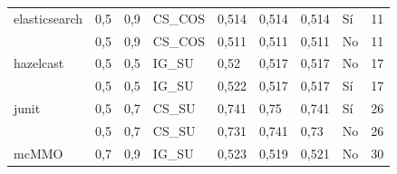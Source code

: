 \begin{table}[H]
{{\begin{tabular}{lllllllll}
elasticsearch                        & 0,5                               & 0,9                            & CS\_COS                                     & 0,514                                  & 0,514                               & 0,514                                 & Sí                               & 11                                        \\
                       & 0,5                               & 0,9                            & CS\_COS                                     & 0,511                                  & 0,511                               & 0,511                                 & No                                   & 11                                        \\
hazelcast                            & 0,5                               & 0,5                            & IG\_SU                                      & 0,52                                   & 0,517                               & 0,517                                 & No                                   & 17                                        \\
                            & 0,5                               & 0,5                            & IG\_SU                                      & 0,522                                  & 0,517                               & 0,517                                 & Sí                               & 17                                        \\
junit                                & 0,5                               & 0,7                            & CS\_SU                                      & 0,741                                  & 0,75                                & 0,741                                 & Sí                               & 26                                        \\
                                & 0,5                               & 0,7                            & CS\_SU                                      & 0,731                                  & 0,741                               & 0,73                                  & No                                   & 26                                        \\
mcMMO                                & 0,7                               & 0,9                            & IG\_SU                                      & 0,523                                  & 0,519                               & 0,521                                 & No                                   & 30                                        \\

\end{tabular}}}
\end{table}
